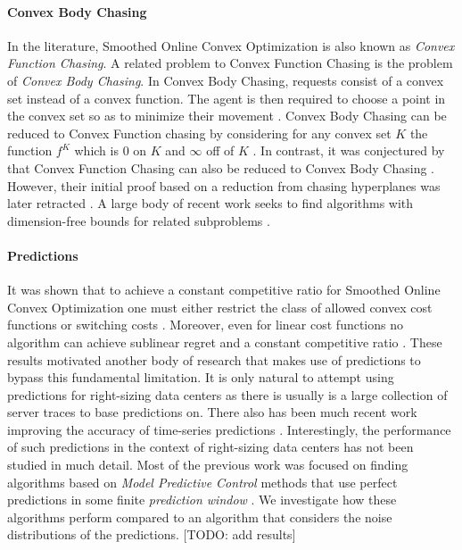 \paragraph{Convex Body Chasing} In the literature, Smoothed Online Convex Optimization is also known as \textit{Convex Function Chasing}. A related problem to Convex Function Chasing is the problem of \textit{Convex Body Chasing}. In Convex Body Chasing, requests consist of a convex set instead of a convex function. The agent is then required to choose a point in the convex set so as to minimize their movement \cite{Antoniadis2016}. Convex Body Chasing can be reduced to Convex Function chasing by considering for any convex set $K$ the function $f^K$ which is 0 on $K$ and $\infty$ off of $K$ \cite{Sellke2019}. In contrast, it was conjectured by \citeauthor*{Antoniadis2016} that Convex Function Chasing can also be reduced to Convex Body Chasing \cite{Antoniadis2016}. However, their initial proof based on a reduction from chasing hyperplanes was later retracted \cite{Pruhs2021}. A large body of recent work seeks to find algorithms with dimension-free bounds for related subproblems \cite{Bubeck2018, Bubeck2018_2, Argue2019, Argue2020}.

\paragraph{Predictions} It was shown that to achieve a constant competitive ratio for Smoothed Online Convex Optimization one must either restrict the class of allowed convex cost functions or switching costs \cite{Chen2018}. Moreover, even for linear cost functions no algorithm can achieve sublinear regret and a constant competitive ratio \cite{Andrew2015}. These results motivated another body of research that makes use of predictions to bypass this fundamental limitation. It is only natural to attempt using predictions for right-sizing data centers as there is usually is a large collection of server traces to base predictions on. There also has been much recent work improving the accuracy of time-series predictions \cite{Taylor2017, Benidis2020, Chen2020, Hosseini2021}. Interestingly, the performance of such predictions in the context of right-sizing data centers has not been studied in much detail. Most of the previous work was focused on finding algorithms based on \textit{Model Predictive Control} methods that use perfect predictions in some finite \textit{prediction window} \cite{Lin2012, Chen2015, Badiei2015, Chen2016, Li2018, Lin2019}. We investigate how these algorithms perform compared to an algorithm that considers the noise distributions of the predictions. [TODO: add results]

